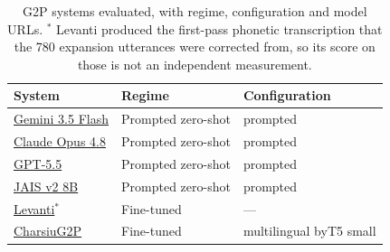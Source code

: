 \begin{table}[t]
\centering
\small
\begin{tabular}{l l l}
\toprule
\textbf{System} & \textbf{Regime} & \textbf{Configuration} \\
\midrule
\href{https://ai.google.dev/gemini-api/docs/models}{Gemini 3.5 Flash} & Prompted zero-shot & prompted \\
\href{https://docs.claude.com/en/docs/about-claude/models}{Claude Opus 4.8} & Prompted zero-shot & prompted \\
\href{https://platform.openai.com/docs/models}{GPT-5.5} & Prompted zero-shot & prompted \\
\href{https://huggingface.co/inceptionai/Jais-2-8B-Chat}{JAIS v2 8B} & Prompted zero-shot & prompted \\
\href{https://huggingface.co/guymorlan/levanti_arabic2diacritics}{Levanti}$^{*}$ & Fine-tuned & --- \\
\href{https://huggingface.co/charsiu/g2p_multilingual_byT5_small_100}{CharsiuG2P} & Fine-tuned & multilingual byT5 small \\
\bottomrule
\end{tabular}
\caption{G2P systems evaluated, with regime, configuration and model URLs. $^{*}$ Levanti produced the first-pass phonetic transcription that the 780 expansion utterances were corrected from, so its score on those is not an independent measurement.}
\label{tab:g2p-models}
\end{table}
